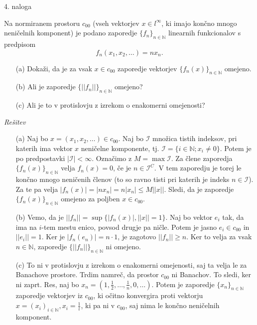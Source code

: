 \documentclass[a4paper, 12pt]{article}
\newcommand{\N}{\mathbb{N}}
\begin{document}
\begin{flushleft}
4. naloga
\end{flushleft}
Na normiranem prostoru $c_{00}$ (vseh vektorjev $x\in l^{\infty}$, ki imajo končno mnogo neničelnih komponent) je podano zaporedje $\{f_n\}_{n\in \N}$ linearnih funkcionalov s predpisom
$$
f_n(x_1,x_2,\dots) = n x_n.
$$
\begin{enumerate}
\item[(a)] Dokaži, da je za vsak $x\in c_{00}$ zaporedje vektorjev $\{ f_n(x) \}_{n\in \N}$ omejeno.
\item[(b)] Ali je zaporedje $\{ || f_n || \}_{n\in \N}$ omejeno?
\item[(c)] Ali je to v protislovju z izrekom o enakomerni omejenosti?
\end{enumerate}
\emph{Rešitev}
\begin{enumerate}
\item[(a)] Naj bo $x=(x_1,x_2,\dots) \in c_{00}$. Naj bo $\mathcal{I}$ množica tistih indeksov, pri katerih ima vektor $x$ neničelne komponente, tj. $\mathcal{I} = \{ i \in \N; x_i \neq 0\}$. Potem je po predpostavki $|\mathcal{I} | < \infty$. Označimo z $M = \max \mathcal{I}$. Za člene zaporedja $\{f_n(x)\}_{n\in \N}$ velja $f_n(x) = 0$, če je $n\in \mathcal{I}^C$. V tem zaporedju je torej le končno mnogo neničenih členov (to so ravno tisti pri katerih je indeks $n\in \mathcal{I}$). Za te pa velja $|f_n(x)| = |nx_n| =n |x_n| \le M ||x||$. Sledi, da je zaporedje $\{f_n(x)\}_{n\in \N}$ omejeno za poljben $x\in c_{00}$.

\item[(b)] Vemo, da je $||f_n|| = \sup\{|f_n(x)|, ||x||=1\}$. Naj bo vektor $e_i$ tak, da ima na $i$-tem mestu enico, povsod drugje pa ničle. Potem je jasno $e_i\in c_{00}$ in $||e_i||=1$. Ker je $|f_n(e_n)| = n\cdot 1$, je zagotovo $||f_n|| \ge n$. Ker to velja za vsak $n\in \N$, zaporedje $\{||f_n||\}_{n\in \N}$ ni omejeno.

\item[(c)] To ni v protislovju z izrekom o enakomerni omejenosti, saj ta velja le za Banachove prostore. Trdim namreč, da prostor $c_{00}$ ni Banachov. To sledi, ker ni zaprt. Res, naj bo $x_{n} = (1,\frac{1}{2},\dots,\frac{1}{n},0,\dots)$. Potem je zaporedje $\{x_n\}_{n\in\N}$ zaporedje vektorjev iz $c_{00}$, ki očitno konvergira proti vektorju $x=(x_i)_{i\in \N}, x_i = \frac{1}{i}$, ki pa ni v $c_{00}$, saj nima le končno neničelnih komponent. 
\end{enumerate}
\end{document}
